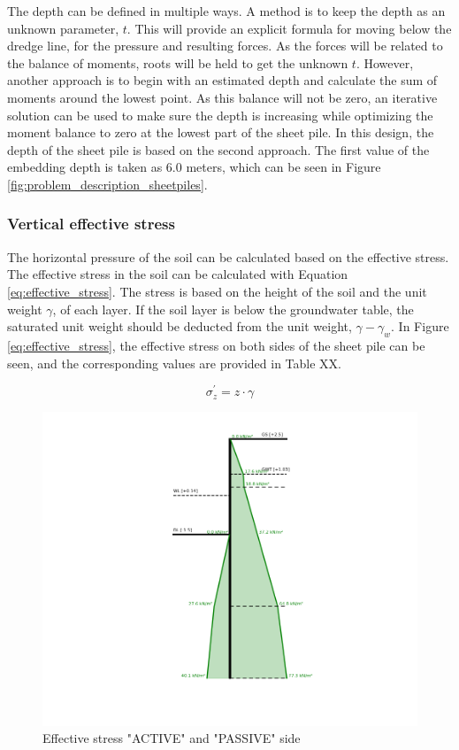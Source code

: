 The depth can be defined in multiple ways. A method is to keep the depth as an unknown parameter, $t$. This will provide an explicit formula for moving below the dredge line, for the pressure and resulting forces. As the forces will be related to the balance of moments, roots will be held to get the unknown $t$. However, another approach is to begin with an estimated depth and calculate the sum of moments around the lowest point. As this balance will not be zero, an iterative solution can be used to make sure the depth is increasing while optimizing the moment balance to zero at the lowest part of the sheet pile. In this design, the depth of the sheet pile is based on the second approach. The first value of the embedding depth is taken as $6.0$ meters, which can be seen in Figure \ref{fig:problem_description_sheetpiles}.

\newpage

\subsubsection{Vertical effective stress}

The horizontal pressure of the soil can be calculated based on the effective stress. The effective stress in the soil can be calculated with Equation \ref{eq:effective_stress}. The stress is based on the height of the soil and the unit weight $\gamma$, of each layer. If the soil layer is below the groundwater table, the saturated unit weight should be deducted from the unit weight, $\gamma - \gamma_{w}$. In Figure \ref{eq:effective_stress}, the effective stress on both sides of the sheet pile can be seen, and the corresponding values are provided in Table XX.

\begin{equation}
    \sigma^{'}_{z} = z \cdot \gamma
    \label{eq:effective_stress}
\end{equation}

\begin{figure}[H]
    \centering
    \includegraphics[width=0.7\linewidth]{figures/ch8/effective_stress.png}
    \caption{Effective stress "ACTIVE" and "PASSIVE" side}
    \label{fig:effective_stress}
\end{figure}

